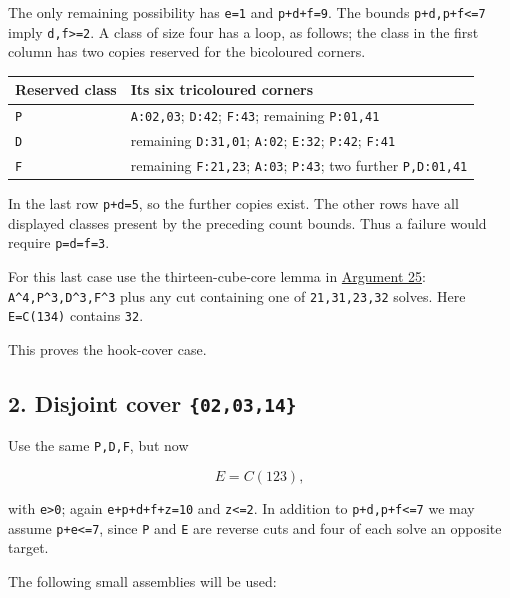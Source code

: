 \documentclass[
  10pt,
]{article}
\begin{document}
The only remaining possibility has \texttt{e=1} and \texttt{p+d+f=9}.
The bounds \texttt{p+d,p+f\textless{}=7} imply
\texttt{d,f\textgreater{}=2}. A class of size four has a loop, as
follows; the class in the first column has two copies reserved for the
bicoloured corners.

\begin{longtable}[]{@{}ll@{}}
\toprule\noalign{}
Reserved class & Its six tricoloured corners \\
\midrule\noalign{}
\endhead
\bottomrule\noalign{}
\endlastfoot
\texttt{P} & \texttt{A:02,03}; \texttt{D:42}; \texttt{F:43}; remaining
\texttt{P:01,41} \\
\texttt{D} & remaining \texttt{D:31,01}; \texttt{A:02}; \texttt{E:32};
\texttt{P:42}; \texttt{F:41} \\
\texttt{F} & remaining \texttt{F:21,23}; \texttt{A:03}; \texttt{P:43};
two further \texttt{P,D:01,41} \\
\end{longtable}

In the last row \texttt{p+d=5}, so the further copies exist. The other
rows have all displayed classes present by the preceding count bounds.
Thus a failure would require \texttt{p=d=f=3}.

For this last case use the thirteen-cube-core lemma in
\protect\hyperlink{arg-25}{Argument 25}:
\texttt{A\^{}4,P\^{}3,D\^{}3,F\^{}3} plus any cut containing one of
\texttt{21,31,23,32} solves. Here \texttt{E=C(134)} contains
\texttt{32}.

This proves the hook-cover case.

\hypertarget{disjoint-cover-020314}{%
\subsection*{\texorpdfstring{2. Disjoint cover
\texttt{\{02,03,14\}}}{2. Disjoint cover \{02,03,14\}}}\label{disjoint-cover-020314}}

Use the same \texttt{P,D,F}, but now

\[
E=C(123),
\]

with \texttt{e\textgreater{}0}; again \texttt{e+p+d+f+z=10} and
\texttt{z\textless{}=2}. In addition to \texttt{p+d,p+f\textless{}=7} we
may assume \texttt{p+e\textless{}=7}, since \texttt{P} and \texttt{E}
are reverse cuts and four of each solve an opposite target.

The following small assemblies will be used:
\end{document}
